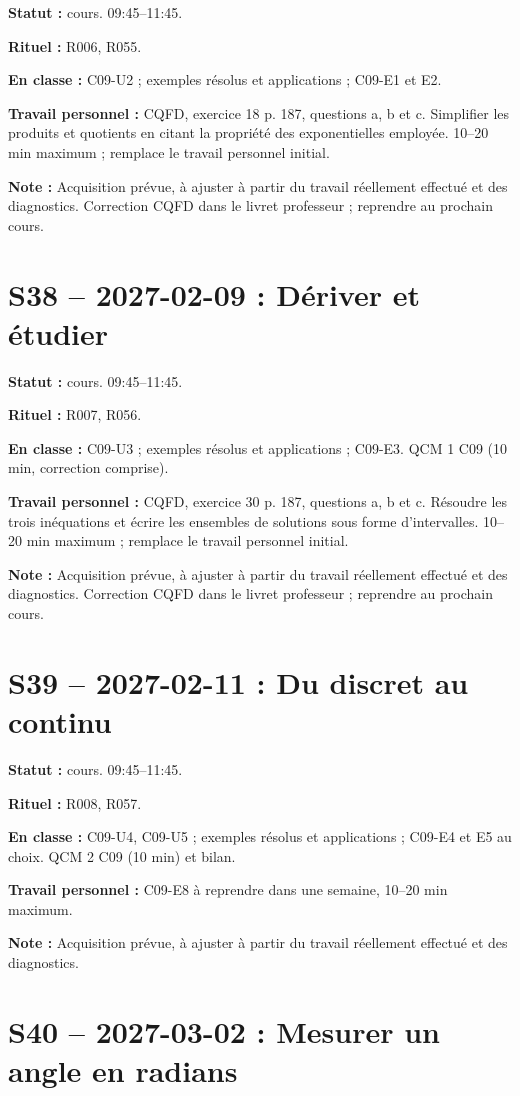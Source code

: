\textbf{Statut :} cours. 09:45–11:45.\par\textbf{Rituel :} R006, R055.\par\textbf{En classe :} C09-U2 ; exemples résolus et applications ; C09-E1 et E2. \par\textbf{Travail personnel :} CQFD, exercice 18 p. 187, questions a, b et c. Simplifier les produits et quotients en citant la propriété des exponentielles employée. 10–20 min maximum ; remplace le travail personnel initial.\par\textbf{Note :} Acquisition prévue, à ajuster à partir du travail réellement effectué et des diagnostics. Correction CQFD dans le livret professeur ; reprendre au prochain cours.
\section*{S38 -- 2027-02-09 : Dériver et étudier}
\textbf{Statut :} cours. 09:45–11:45.\par\textbf{Rituel :} R007, R056.\par\textbf{En classe :} C09-U3 ; exemples résolus et applications ; C09-E3.  QCM 1 C09 (10 min, correction comprise).\par\textbf{Travail personnel :} CQFD, exercice 30 p. 187, questions a, b et c. Résoudre les trois inéquations et écrire les ensembles de solutions sous forme d’intervalles. 10–20 min maximum ; remplace le travail personnel initial.\par\textbf{Note :} Acquisition prévue, à ajuster à partir du travail réellement effectué et des diagnostics. Correction CQFD dans le livret professeur ; reprendre au prochain cours.
\section*{S39 -- 2027-02-11 : Du discret au continu}
\textbf{Statut :} cours. 09:45–11:45.\par\textbf{Rituel :} R008, R057.\par\textbf{En classe :} C09-U4, C09-U5 ; exemples résolus et applications ; C09-E4 et E5 au choix.  QCM 2 C09 (10 min) et bilan.\par\textbf{Travail personnel :} C09-E8 à reprendre dans une semaine, 10–20 min maximum.\par\textbf{Note :} Acquisition prévue, à ajuster à partir du travail réellement effectué et des diagnostics.
\section*{S40 -- 2027-03-02 : Mesurer un angle en radians}
